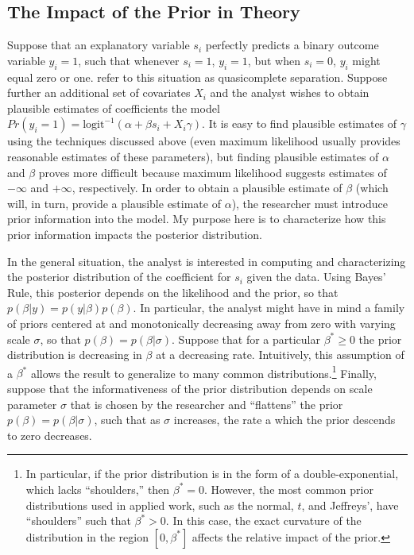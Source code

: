 \documentclass[12pt]{article}
\begin{document}
\subsection*{The Impact of the Prior in Theory}

Suppose that an explanatory variable $s_i$ perfectly predicts a binary outcome variable $y_i = 1$, such that whenever $s_i = 1$, $y_i = 1$, but when $s_i = 0$, $y_i$ might equal zero or one. \cite{AlbertAnderson1984} refer to this situation as quasicomplete separation. Suppose further an additional set of covariates $X_i$ and the analyst wishes to obtain plausible estimates of coefficients the model $Pr(y_i =1) = \text{logit}^{-1}(\alpha + \beta s_i + X_i \gamma)$. It is easy to find plausible estimates of $\gamma$ using the techniques discussed above (even maximum likelihood usually provides reasonable estimates of these parameters), but finding plausible estimates of $\alpha$ and $\beta$ proves more difficult because maximum likelihood suggests estimates of $-\infty$ and $+\infty$, respectively. In order to obtain a plausible estimate of $\beta$ (which will, in turn, provide a plausible estimate of $\alpha$), the researcher must introduce prior information into the model. My purpose here is to characterize how this prior information impacts the posterior distribution.

In the general situation, the analyst is interested in computing and characterizing the posterior distribution of the coefficient for $s_i$ given the data. Using Bayes' Rule, this posterior depends on the likelihood and the prior, so that $p(\beta | y) = p(y|\beta)p(\beta)$. In particular, the analyst might have in mind a family of priors centered at and monotonically decreasing away from zero with varying scale $\sigma$, so that $p(\beta) = p(\beta|\sigma)$. Suppose that for a particular $\beta^* \geq 0$ the prior distribution is decreasing in $\beta$ at a decreasing rate. Intuitively, this assumption of a $\beta^*$ allows the result to generalize to many common distributions.\footnote{In particular, if the prior distribution is in the form of a double-exponential, which lacks ``shoulders,'' then $\beta^* = 0$. However, the most common prior distributions used in applied work, such as the normal, $t$, and Jeffreys', have ``shoulders'' such that $\beta^* > 0$. In this case, the exact curvature of the distribution in the region $[0, \beta^*]$ affects the relative impact of the prior.} 
Finally, suppose that the informativeness of the prior distribution depends on scale parameter $\sigma$ that is chosen by the researcher and ``flattens'' the prior $p(\beta) = p(\beta | \sigma)$, such that as $\sigma$ increases, the rate a which the prior descends to zero decreases.
\end{document}
